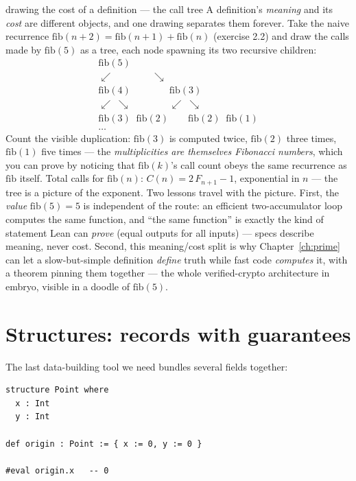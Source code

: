 \begin{worked}{drawing the cost of a definition --- the  call tree}
A definition's \emph{meaning} and its \emph{cost} are different objects,
and one drawing separates them forever. Take the naive recurrence
$\mathrm{fib}(n{+}2) = \mathrm{fib}(n{+}1) + \mathrm{fib}(n)$ (exercise
2.2) and draw the calls made by $\mathrm{fib}(5)$ as a tree, each node
spawning its two recursive children:
\[
\begin{array}{c}
\mathrm{fib}(5)\\
\swarrow \qquad\qquad \searrow\\
\mathrm{fib}(4) \qquad\qquad \mathrm{fib}(3)\\
\swarrow\;\searrow \qquad\qquad \swarrow\;\searrow\\
\mathrm{fib}(3)\;\;\mathrm{fib}(2) \qquad \mathrm{fib}(2)\;\;\mathrm{fib}(1)\\
\dots
\end{array}
\]
Count the visible duplication: $\mathrm{fib}(3)$ is computed twice,
$\mathrm{fib}(2)$ three times, $\mathrm{fib}(1)$ five times --- the
\emph{multiplicities are themselves Fibonacci numbers}, which you can
prove by noticing that $\mathrm{fib}(k)$'s call count obeys the same
recurrence as $\mathrm{fib}$ itself. Total calls for $\mathrm{fib}(n)$:
$C(n) = 2\,F_{n+1} - 1$, exponential in $n$ --- the tree is a picture
of the exponent. Two lessons travel with the picture. First, the
\emph{value} $\mathrm{fib}(5) = 5$ is independent of the route: an
efficient two-accumulator loop computes the same function, and
``the same function'' is exactly the kind of statement Lean can
\emph{prove} (equal outputs for all inputs) --- specs describe
meaning, never cost. Second, this meaning/cost split is why
Chapter~\ref{ch:prime} can let a slow-but-simple definition
\emph{define} truth while fast code \emph{computes} it, with a theorem
pinning them together --- the whole verified-crypto architecture in
embryo, visible in a doodle of $\mathrm{fib}(5)$.
\end{worked}

\section{Structures: records with guarantees}

The last data-building tool we need bundles several fields together:

\begin{lstlisting}[language=Lean]
structure Point where
  x : Int
  y : Int

def origin : Point := { x := 0, y := 0 }

#eval origin.x   -- 0
\end{lstlisting}

